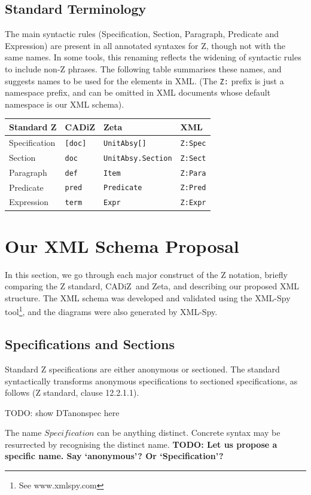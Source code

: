 \documentclass{llncs}  %
\newcommand{\AFont}[1]{\texttt{#1}}
\newcommand{\CADiZ}{CADiZ}
\newcommand{\Zeta}{Zeta}
\newcommand{\ASpecification}{Specification}
\newcommand{\ASection}{Section}
\newcommand{\AParagraph}{Paragraph}
\newcommand{\APredicate}{Predicate}
\newcommand{\AExpression}{Expression}
\newcommand{\DTanonspec}{\par TODO: show DTanonspec here \par}
\newcommand{\TODO}[1]{\textbf{TODO: #1}}   %
\begin{document}
\subsection{Standard Terminology}

The main syntactic rules (Specification, Section, Paragraph, Predicate and
Expression) are present in all annotated syntaxes for Z, though not with
the same names.  In some tools, this renaming reflects the widening of
syntactic rules to include non-Z phrases.  The following table summarises
these names, and suggests names to be used for the elements in XML.
(The \verb!Z:! prefix is just a namespace prefix, and can be omitted
in XML documents whose default namespace is our XML schema).

\begin{center}
\begin{tabular}{|l|l|l|l|}
\hline
{\bf Standard Z} & {\bf \CADiZ} & {\bf \Zeta} & {\bf XML}\\
\hline
\ASpecification & \AFont{[doc]} & \AFont{UnitAbsy[]} & \AFont{Z:Spec}\\
\ASection & \AFont{doc} & \AFont{UnitAbsy.Section} & \AFont{Z:Sect}\\
\AParagraph & \AFont{def} & \AFont{Item} & \AFont{Z:Para}\\
\APredicate & \AFont{pred} & \AFont{Predicate} & \AFont{Z:Pred}\\
\AExpression & \AFont{term} & \AFont{Expr} & \AFont{Z:Expr}\\
\hline
\end{tabular}
\end{center}


\section{Our XML Schema Proposal}

In this section, we go through each major construct of the
Z notation, briefly comparing the Z standard, \CADiZ\ and \Zeta,
and describing our proposed XML structure.  The XML schema was
developed and validated using the XML-Spy tool\footnote{See
  www.xmlspy.com}, and the diagrams were also generated by XML-Spy.

\subsection{Specifications and Sections}\label{Specification}

Standard Z specifications are either anonymous or sectioned.
The standard syntactically transforms anonymous specifications
to sectioned specifications, as follows (Z standard, clause 12.2.1.1).
\DTanonspec
The name $Specification$ can be anything distinct.
Concrete syntax may be resurrected by recognising the distinct name.
\TODO{Let us propose a specific name.  Say `anonymous'?  Or
  `Specification'?}
\end{document}
